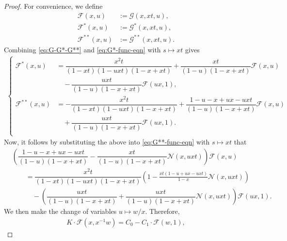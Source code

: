\documentclass[reqno]{amsart}
\numberwithin{equation}{section}
\theoremstyle{plain}
\theoremstyle{definition}
\theoremstyle{named}
\newcommand{\cN}{\mathcal{N}}
\newcommand{\cG}{\mathcal{G}}
\newcommand{\cF}{\mathcal{F}}
\begin{document}
\begin{proof}
	For convenience, we define
	\begin{align*}
		\cF(x,u)&:=\cG(x,xt,u),\\
		\cF^*(x,u)&:=\cG^*(x,xt,u),\\
		\cF^{**}(x,u)&:=\cG^{**}(x,xt,u).
	\end{align*}
	Combining \eqref{eq:G-G*-G**} and \eqref{eq:G*-func-eqn} with $s\mapsto xt$ gives
	\begin{align*}
		\left\{\begin{aligned}
			\cF^*(x,u)&=\dfrac{x^2t}{(1-xt)(1-uxt)(1-x+xt)}+\dfrac{xt}{(1-u)(1-x+xt)}\cF(x,u)\\
			&\quad-\dfrac{uxt}{(1-u)(1-x+xt)}\cF(ux,1),\\[12pt]
			\cF^{**}(x,u)&=-\dfrac{x^2t}{(1-xt)(1-uxt)(1-x+xt)}+\dfrac{1-u-x+ux-uxt}{(1-u)(1-x+xt)}\cF(x,u)\\
			&\quad+\dfrac{uxt}{(1-u)(1-x+xt)}\cF(ux,1).\\
		\end{aligned}\right.
	\end{align*}
	Now, it follows by substituting the above into \eqref{eq:G**-func-eqn} with $s\mapsto xt$ that
	\begin{align*}
		&\left(\dfrac{1-u-x+ux-uxt}{(1-u)(1-x+xt)}-\dfrac{xt}{(1-u)(1-x+xt)}\cN(x,uxt)\right)\cF(x,u)\\
		&\qquad=\dfrac{x^2t}{(1-xt)(1-uxt)(1-x+xt)}\left(1-\frac{xt(1-u+ux-uxt)}{1-x}\cN(x,uxt)\right)\\
		&\qquad\quad-\left(\dfrac{uxt}{(1-u)(1-x+xt)}+\dfrac{uxt}{(1-u)(1-x+xt)}\cN(x,uxt)\right)\cF(ux,1).
	\end{align*}
	We then make the change of variables $u\mapsto w/x$. Therefore,
	\begin{align}\label{eq:F-kernel}
		K\cdot \cF(x,x^{-1}w)=C_0-C_1\cdot \cF(w,1),
	\end{align}

\end{proof}
\end{document}

